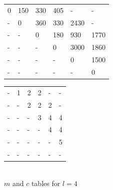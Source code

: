 \documentclass[11pt]{article}
\begin{document}
\begin{sol}
{	%

	\centering
	\begin{tabular}{|l|l|l|l|l|l|}
		 \hline
        0 & 150 & 330 & 405 & - & - \\ 
        - & 0 & 360 &330 & 2430 & - \\ 
        - & - & 0 & 180 & 930 & 1770 \\ 
        - & - & - & 0 & 3000 & 1860\\ 
        - & - & - & - & 0 & 1500  \\ 
        - & - & - & - & - & 0 \\
        \hline
	\end{tabular}
	\hspace{20mm}
	\begin{tabular}{|l|l|l|l|l|l|}
		 \hline
        - & 1 & 2 & 2 & - & - \\ 
        - & - & 2 & 2 & 2 & - \\ 
        - & - & - & 3 & 4 & 4 \\ 
        - & - & - & - & 4 & 4 \\ 
        - & - & - & - & - & 5 \\ 
        - & - & - & - & - & - \\
        \hline
	\end{tabular} \\ 
\vspace{0.5cm}
$m$ and $c$ tables for $l = 4$\\ 
\vspace{0.5cm}


}
\end{sol}
\end{document}
